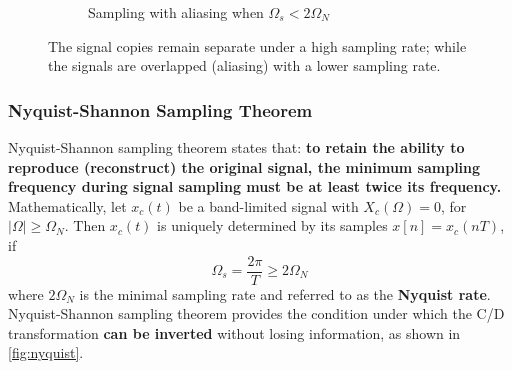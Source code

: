 \begin{figure}[H]
\begin{subfigure}{.45\textwidth}
\caption{Sampling with aliasing when $\Omega_{s} < 2\Omega_{N}$}
\end{subfigure}
\caption{The signal copies remain separate under a high sampling rate; while the signals are overlapped (aliasing) with a lower sampling rate.} 
\label{fig:aliasing}
\end{figure}



\subsubsection{Nyquist-Shannon Sampling Theorem}
Nyquist-Shannon sampling theorem states that: \textbf{to retain the ability to reproduce (reconstruct) the original signal, the minimum sampling frequency during signal sampling must be at least twice its frequency.}\\

Mathematically, let $x_{c}(t)$ be a band-limited signal with $X_{c}(\Omega)=0$, for $\lvert \Omega \rvert \geq \Omega_{N}$. Then $x_{c}(t)$ is uniquely determined by its samples $x[n] = x_{c}(nT)$, if 
\[ \Omega_{s}=\frac{2\pi}{T} \geq 2\Omega_{N} \]
where $2\Omega_{N}$ is the minimal sampling rate and referred to as the \textbf{Nyquist rate}.\\

Nyquist-Shannon sampling theorem provides the condition under which the C/D transformation \textbf{can be inverted} without losing information, as shown in \autoref{fig:nyquist}.

